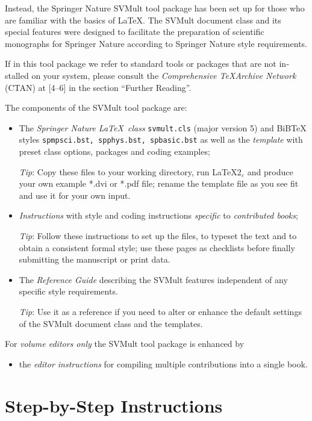 \documentclass[graybox]{svmult}
\begin{document}
\begin{refguide}
\begin{sloppy}
Instead, the Springer Nature {\sc SVMult} tool package has been set up for those who are familiar with the basics of \LaTeX. The {\sc SVMult} document class and its special features were designed to facilitate the preparation of scientific monographs for Springer Nature according to Springer Nature style requirements.

If in this tool package we refer to standard tools or packages that are not in­stalled on your system, please consult the {\it Comprehensive \TeX Archive Network} (CTAN) at [4--6] in the section ``Further Reading''.

The components of the {\sc SVMult} tool package are:

\begin{itemize}
\item The {\it Springer Nature \LaTeX~class} {\tt svmult.cls} (major version 5) and BiBTeX styles {\tt spmpsci.bst, spphys.bst, spbasic.bst} as well as the {\it template} with preset class options, packages and coding examples;

{\it Tip}: Copy these files to your working directory, run \LaTeX2$_\varepsilon$ and produce your own example *.dvi or *.pdf file; rename the template file as you see fit and use it for your own input.

\item {\it Instructions} with style and coding instructions {\it specific} to {\it contributed books};

{\it Tip}: Follow these instructions to set up the files, to typeset the text and to obtain a consistent formal style; use these pages as checklists before finally submitting the manuscript or print data.
\item The {\it Reference Guide} describing the {\sc SVMult} features independent of any specific style requirements.

{\it Tip}: Use it as a reference if you need to alter or enhance the default settings of the {\sc SVMult} document class and the templates.
\end{itemize}


For {\it volume editors only} the {\sc SVMult} tool package is enhanced by

\begin{itemize}
\item the {\it editor instructions} for compiling multiple contributions into a single book.
\end{itemize}

\section{ Step-by-Step Instructions}


\end{sloppy}
\end{refguide}
\end{document}
